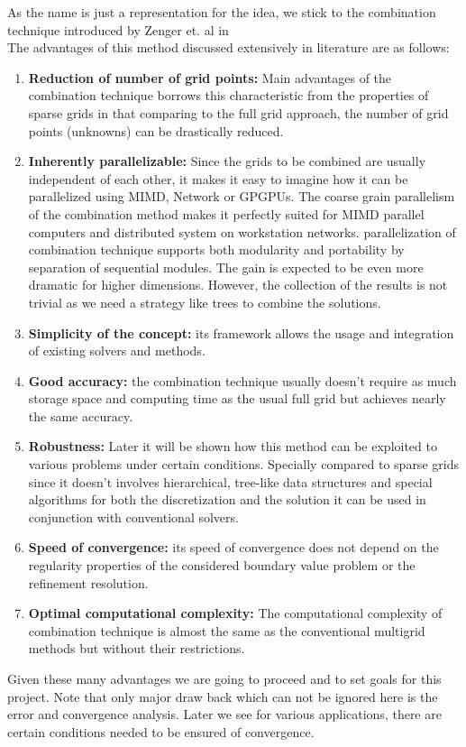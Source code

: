 As the name is just a representation for the idea, we stick to the combination technique introduced by Zenger et. al in  \cite{Griebel1992b}\\
The advantages of this method discussed extensively in literature are as follows:

\begin{enumerate}
	\item \textbf{Reduction of number of grid points:} Main advantages of the combination technique borrows this characteristic from the properties of sparse grids in that comparing to the full grid approach, the number of grid points (unknowns) can be drastically reduced.
	\item \textbf{Inherently parallelizable:} Since the grids to be combined are usually independent of each other, it makes it easy to imagine how it can be parallelized using MIMD\cite{Griebel1992a}, Network\cite{Griebel1992} or GPGPUs\cite{Gaikwad2009}. The coarse grain parallelism of the combination method makes it perfectly suited for MIMD parallel computers and distributed system on workstation networks. parallelization of combination technique supports both modularity and portability by separation of sequential modules. The gain is expected to be even more dramatic for higher dimensions. However, the collection of the results is not trivial as we need a strategy like trees to combine the solutions.
	\item \textbf{Simplicity of the concept:} its framework allows the usage and integration of existing solvers and methods\cite{Bungartz1994}.
	\item \textbf{Good accuracy:} the combination technique usually doesn't require as much storage space and computing time as the usual full grid but achieves nearly the same accuracy\cite{Griebel1995}.
    \item \textbf{Robustness:} Later it will be shown how this method can be exploited to various problems under certain conditions. Specially compared to sparse grids since it doesn't involves hierarchical, tree-like data structures and special algorithms for both the discretization and the solution it can be used in conjunction with conventional solvers.
    \item \textbf{Speed of convergence:} its speed of convergence does not depend on the regularity properties of the considered boundary value problem or the refinement resolution\cite{Yserentant1986}.
    \item \textbf{Optimal computational complexity:} The computational complexity of combination technique is almost the same as the conventional multigrid methods but without their restrictions\cite{Yserentant1986}.
\end{enumerate}

Given these many advantages we are going to proceed and to set goals for this project. Note that only major draw back which can not be ignored here is the error and convergence analysis. Later we see for various applications, there are certain conditions needed to be ensured of convergence.
